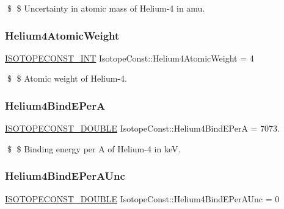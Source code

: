 \$ \$ Uncertainty in atomic mass of Helium-\/4 in amu. \mbox{\label{group___isotope_const-_helium-_he4_ga89644480de79668a374268ae5ed1db8e}} 
\subsubsection{\texorpdfstring{Helium4\+Atomic\+Weight}{Helium4AtomicWeight}}
{\footnotesize\ttfamily \mbox{\hyperlink{group___isotope_const-_macros_ga5f18360b3e99483a35c32d789e62621c}{I\+S\+O\+T\+O\+P\+E\+C\+O\+N\+S\+T\+\_\+\+I\+NT}} Isotope\+Const\+::\+Helium4\+Atomic\+Weight = 4}

\$ \$ Atomic weight of Helium-\/4. \mbox{\label{group___isotope_const-_helium-_he4_ga97b6e9b8093bb1dc55cb1df0d0bbe96f}} 
\subsubsection{\texorpdfstring{Helium4\+Bind\+E\+PerA}{Helium4BindEPerA}}
{\footnotesize\ttfamily \mbox{\hyperlink{group___isotope_const-_macros_ga8f45a7272ce02c0b4c65c44636ed719a}{I\+S\+O\+T\+O\+P\+E\+C\+O\+N\+S\+T\+\_\+\+D\+O\+U\+B\+LE}} Isotope\+Const\+::\+Helium4\+Bind\+E\+PerA = 7073.}

\$ \$ Binding energy per A of Helium-\/4 in keV. \mbox{\label{group___isotope_const-_helium-_he4_ga826c1357275b2e91d6938b4b5f83e5d9}} 
\subsubsection{\texorpdfstring{Helium4\+Bind\+E\+Per\+A\+Unc}{Helium4BindEPerAUnc}}
{\footnotesize\ttfamily \mbox{\hyperlink{group___isotope_const-_macros_ga8f45a7272ce02c0b4c65c44636ed719a}{I\+S\+O\+T\+O\+P\+E\+C\+O\+N\+S\+T\+\_\+\+D\+O\+U\+B\+LE}} Isotope\+Const\+::\+Helium4\+Bind\+E\+Per\+A\+Unc = 0}


